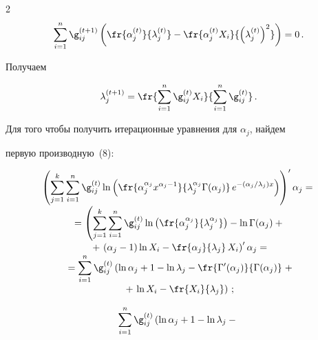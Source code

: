 \begin{multicols}{2}
$$


\sum\limits_{i=1}^n \g_{ij}^{(t+1)}\left ( \fr{\alpha_j^{(t)}}{\lambda_j^{(t)}}


- \fr{\alpha_j^{(t)}X_i}{\left ( \lambda_j^{(t)}\right )^2}\right ) =0 \,.


$$


Получаем


$$


\lambda_j^{(t+1)} = \fr{\sum\limits_{i=1}^n \g_{ij}^{(t)}


X_i}{\sum\limits_{i=1}^n \g_{ij}^{(t)}}\,.


$$





Для того чтобы получить итерационные уравнения для $\alpha_j$, найдем


первую производную~(8):


\begin{multline*}


\left ( \sum\limits_{j=1}^k\sum\limits_{i=1}^n \g_{ij}^{(t)}\ln \left (


\fr{\alpha_j^{\alpha_j} x^{\alpha_j -1}}{\lambda_j^{\alpha_j}\Gamma (\alpha_j


)}\,e^{-(\alpha_j /\lambda_j ) x} \right ) \right )^\prime \alpha_j ={}\\[-3pt]


{}=\left ( \sum\limits_{j=1}^k\sum\limits_{i=1}^n \g_{ij}^{(t)}\ln \left (


\fr{\alpha_j^{\alpha_j}}{\lambda_j^{\alpha_j}}\right ) - \ln \Gamma (\alpha_j )+{} \right.\\[-3pt]


{}+\left.


(\alpha_j -1 )\ln X_i - \fr{\alpha_j}{\lambda_j}\,X_i \right )^\prime \alpha_j =\\[-3pt]


{}=\sum\limits_{i=1}^n \g_{ij}^{(t)} \left ( \ln \alpha_j +1-\ln \lambda_j -


\fr{\Gamma^\prime (\alpha_j )}{\Gamma (\alpha_j)}\right.+\\[-3pt]


{}+\left. \ln X_i - \fr{X_i}{\lambda_j}\right )\,;


\end{multline*}


\begin{multline*}


\sum\limits_{i=1}^n \g_{ij}^{(t)} \left(  \ln \alpha_j +1 -\ln \lambda_j -{}\right. \\[-3pt]



\end{multline*}
\end{multicols}
